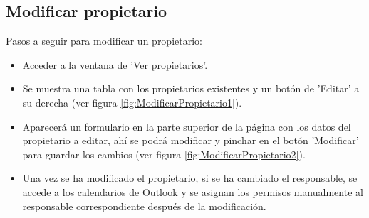 \subsection{Modificar propietario}
Pasos a seguir para modificar un propietario:
\begin{itemize}
    \item Acceder a la ventana de 'Ver propietarios'.
    \item Se muestra una tabla con los propietarios existentes y un botón de 'Editar' a su derecha (ver figura \ref{fig:ModificarPropietario1}).
    \item Aparecerá un formulario en la parte superior de la página con los datos del propietario a editar, ahí se podrá modificar y pinchar en el botón 'Modificar' para guardar los cambios (ver figura \ref{fig:ModificarPropietario2}).

    \item Una vez se ha modificado el propietario, si se ha cambiado el responsable, se accede a los calendarios de Outlook y se asignan los permisos manualmente al responsable correspondiente después de la modificación.
\end{itemize}